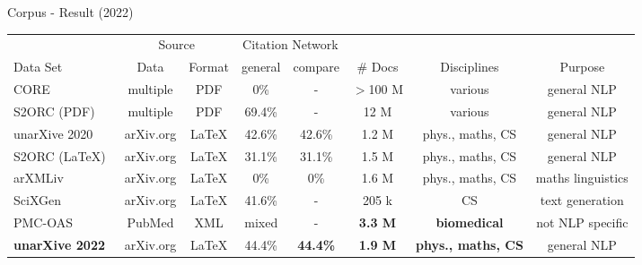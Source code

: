 \documentclass[en,16:9,smallfoot]{sdqbeamer}
\begin{document}
   \begin{frame}{Corpus - Result (2022)}
    \begin{table}
      \centering
      \begin{small}
     \begin{threeparttable}
      \begin{tabular}{lccccccc}
        \toprule
        \ & \multicolumn{2}{c}{Source} & \multicolumn{2}{c}{\hphantom{wi}Citation Network\tnote{a}} & \ & \ & \ \\
        Data Set & Data & Format & general & compare & \# Docs & Disciplines & Purpose \\
        \midrule
        CORE~\cite{core} & multiple & PDF & 0\% & - & $>$100 M & various & general NLP \\
        S2ORC (PDF)~\cite{Lo2020} & multiple & PDF & 69.4\% & - & 12 M & various & general NLP \\
        unarXive 2020~\cite{Saier2020} & arXiv.org & \LaTeX & 42.6\% & 42.6\% & 1.2 M & phys., maths, CS & general NLP \\
        \midrule
        S2ORC (\LaTeX)~\cite{Lo2020} & arXiv.org & \LaTeX & 31.1\% & 31.1\% & 1.5 M & phys., maths, CS & general NLP \\
        arXMLiv~\cite{arXMLiv} & arXiv.org & \LaTeX & 0\% & 0\% & 1.6 M & phys., maths, CS & maths linguistics \\
        SciXGen~\cite{chen2021-scixgen} & arXiv.org & \LaTeX & 41.6\% & - & 205 k & CS & text generation \\
        PMC-OAS~\cite{pmc_oas} & PubMed & XML & mixed\tnote{b} & - & \textbf{3.3 M} & \textbf{biomedical} & not NLP specific \\
        \textbf{unarXive 2022}~\cite{Saier2023unarXive} & arXiv.org & \LaTeX & 44.4\% & \textbf{44.4\%} & \textbf{1.9 M} & \textbf{phys., maths, CS} & general NLP \\

\end{tabular}
\end{threeparttable}
\end{small}
\end{table}
\end{frame}
\end{document}
